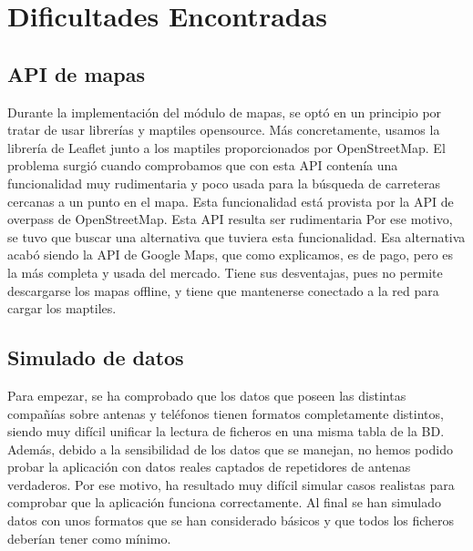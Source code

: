 \section{Dificultades Encontradas\label{SEC:DIFICULTAD}}
  \subsection{API de mapas}
    Durante la implementación del módulo de mapas, se optó en un principio por tratar de usar librerías y maptiles opensource. Más concretamente, usamos la librería de Leaflet junto a los maptiles proporcionados por OpenStreetMap.
    El problema surgió cuando comprobamos que con esta API contenía una funcionalidad muy rudimentaria y poco usada para la búsqueda de carreteras cercanas a un punto en el mapa. Esta funcionalidad está provista por la API de overpass de OpenStreetMap. Esta API resulta ser rudimentaria 
    Por ese motivo, se tuvo que buscar una alternativa que tuviera esta funcionalidad. Esa alternativa acabó siendo la API de Google Maps, que como explicamos, es de pago, pero es la más completa y usada del mercado.
    Tiene sus desventajas, pues no permite descargarse los mapas offline, y tiene que mantenerse conectado a la red para cargar los maptiles.
   \subsection{Simulado de datos}
    Para empezar, se ha comprobado que los datos que poseen las distintas compañías sobre antenas y teléfonos tienen formatos completamente distintos, siendo muy difícil unificar la lectura de ficheros en una misma tabla de la BD.
    Además, debido a la sensibilidad de los datos que se manejan, no hemos podido probar la aplicación con datos reales captados de repetidores de antenas verdaderos. Por ese motivo, ha resultado muy difícil simular casos realistas para comprobar que la aplicación funciona correctamente. Al final se han simulado datos con unos formatos que se han considerado básicos y que todos los ficheros deberían tener como mínimo.
    